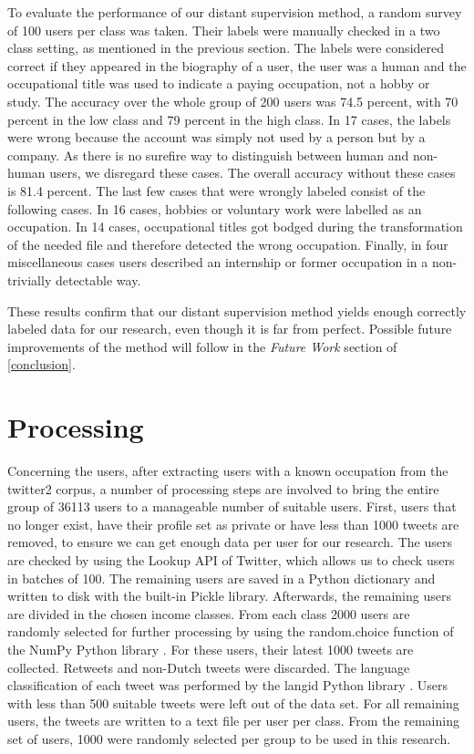 \documentclass[
10pt, %
a4paper, %
oneside, %
headinclude,footinclude, %
] {book}%
\begin{document}
To evaluate the performance of our distant supervision method, a random survey of 100 users per class was taken. Their labels were manually checked in a two class setting, as mentioned in the previous section. The labels were considered correct if they appeared in the biography of a user, the user was a human and the occupational title was used to indicate a paying occupation, not a hobby or study. The accuracy over the whole group of 200 users was 74.5 percent, with 70 percent in the low class and 79 percent in the high class. In 17 cases, the labels were wrong because the account was simply not used by a person but by a company. As there is no surefire way to distinguish between human and non-human users, we disregard these cases. The overall accuracy without these cases is 81.4 percent. The last few cases that were wrongly labeled consist of the following cases. In 16 cases, hobbies or voluntary work were labelled as an occupation. In 14 cases, occupational titles got bodged during the transformation of the needed file and therefore detected the wrong occupation. Finally, in four miscellaneous cases users described an internship or former occupation in a non-trivially detectable way.

These results confirm that our distant supervision method yields enough correctly labeled data for our research, even though it is far from perfect. Possible future improvements of the method will follow in the \textit{Future Work} section of \autoref{conclusion}.

\section{Processing}
\label{sec:processing}
Concerning the users, after extracting users with a known occupation from the twitter2 corpus, a number of processing steps are involved to bring the entire group of 36113 users to a manageable number of suitable users. First, users that no longer exist, have their profile set as private or have less than 1000 tweets are removed, to ensure we can get enough data per user for our research. The users are checked by using the Lookup API of Twitter, which allows us to check users in batches of 100. The remaining users are saved in a Python dictionary and written to disk with the built-in Pickle library. Afterwards, the remaining users are divided in the chosen income classes. From each class 2000 users are randomly selected for further processing by using the random.choice function of the NumPy Python library \citep{numpy}. For these users, their latest 1000 tweets are collected. Retweets and non-Dutch tweets were discarded. The language classification of each tweet was performed by the langid Python library \citep{langid}. Users with less than 500 suitable tweets were left out of the data set. For all remaining users, the tweets are written to a text file per user per class. From the remaining set of users, 1000 were randomly selected per group to be used in this research.
\end{document}
